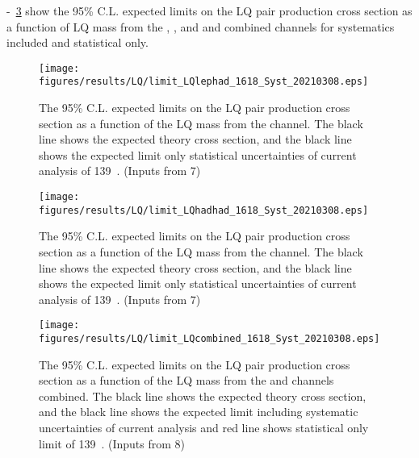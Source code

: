 -~\ref{fig:LQCombinedLimits} show the 95\% C.L. expected limits on the LQ pair production cross section as a function of 
LQ mass from the \lephad, \hadhad, and \lephad and \hadhad combined channels for systematics included and statistical only.

\begin{figure}
\centering
\texttt{[image: figures/results/LQ/limit\_LQlephad\_1618\_Syst\_20210308.eps]}
\caption{The 95\% C.L. expected limits on the LQ pair production cross section as a function of the LQ mass from the \lephad channel. The black line shows the expected theory cross section, and the black line shows the expected limit only statistical uncertainties of current analysis of 139~\ifb. (Inputs from 7)}
\label{fig:LQLepHadLimits}
\end{figure}

\begin{figure}
\centering
\texttt{[image: figures/results/LQ/limit\_LQhadhad\_1618\_Syst\_20210308.eps]}
\caption{The 95\% C.L. expected limits on the LQ pair production cross section as a function of the LQ mass from the \hadhad channel. The black line shows the expected theory cross section, and the black line shows the expected limit only statistical uncertainties of current analysis of 139~\ifb. (Inputs from 7)}
\label{fig:LQHadHadLimits}
\end{figure}

\begin{figure}
\centering
\texttt{[image: figures/results/LQ/limit\_LQcombined\_1618\_Syst\_20210308.eps]}
\caption{The 95\% C.L. expected limits on the LQ pair production cross section as a function of the LQ mass from the \lephad and \hadhad channels combined. The black line shows the expected theory cross section, and the black line shows the expected limit including systematic uncertainties of current analysis and red line shows statistical only limit of 139~\ifb. (Inputs from 8)}
\label{fig:LQCombinedLimits}
\end{figure}

